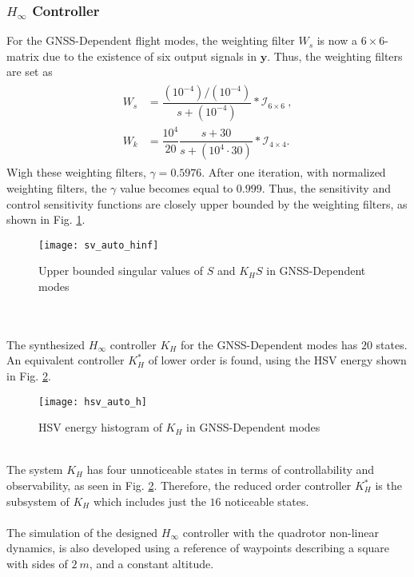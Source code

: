 \subsubsection{$H_\infty$ Controller}
For the GNSS-Dependent flight modes, the weighting filter $W_s$ is now a $6\times 6$-matrix due to the existence of six output signals in $\mathbf{y}$. Thus, the weighting filters are set as
\begin{align}
\begin{split}
W_{s} &= \dfrac{(10^{-4})/(10^{-4})}{s + (10^{-4})}*\mathcal{I}_{6\times 6}\ ,\\[5px]
W_{k} &= \dfrac{10^{4}}{20}\dfrac{s+30}{s+(10^{4}\cdot 30)}*\mathcal{I}_{4\times 4}.
\end{split}
\end{align}
Wigh these weighting filters, $\gamma = 0.5976$. After one iteration, with normalized weighting filters, the $\gamma$ value becomes equal to $0.999$. Thus, the sensitivity and control sensitivity functions are closely upper bounded by the weighting filters, as shown in Fig. \ref{fig:sv_auto_hinf}.
\begin{figure}[h]
\begin{center}
\texttt{[image: sv\_auto\_hinf]}  
\caption{Upper bounded singular values of $S$ and $K_{H}S$ in GNSS-Dependent modes} 
\label{fig:sv_auto_hinf}
\end{center}
\end{figure}
\\\\The synthesized $H_\infty$ controller $K_H$ for the GNSS-Dependent modes has $20$ states. An equivalent controller $K_{H}^{*}$ of lower order is found, using the HSV energy shown in Fig. \ref{fig:hsv_auto_h}.
\begin{figure}[h]
\begin{center}
\texttt{[image: hsv\_auto\_h]}  
\caption{HSV energy histogram of $K_H$ in GNSS-Dependent modes} 
\label{fig:hsv_auto_h}
\end{center}
\end{figure}
\\The system $K_H$ has four unnoticeable states in terms of controllability and observability, as seen in Fig. \ref{fig:hsv_auto_h}. Therefore, the reduced order controller $K_{H}^{*}$ is the subsystem of $K_H$ which includes just the $16$ noticeable states.
\\\\
The simulation of the designed $H_\infty$ controller with the quadrotor non-linear dynamics, is also developed using a reference of waypoints describing a square with sides of $2\ m$, and a constant altitude.
